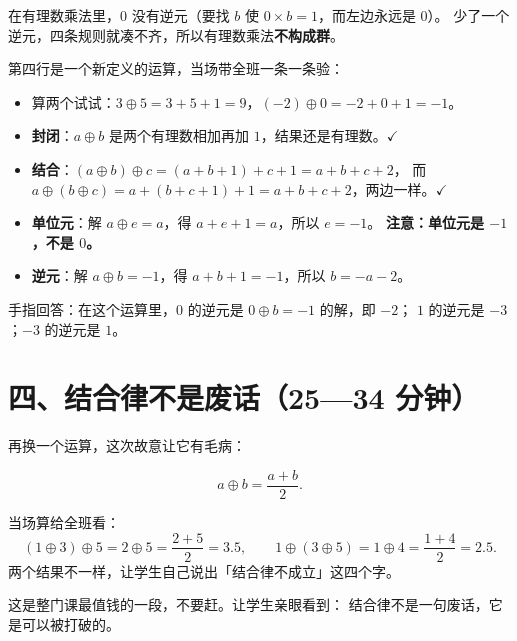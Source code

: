 \begin{dingli}[有理数乘法不构成群]
  在有理数乘法里，\(0\) 没有逆元（要找 \(b\) 使 \(0\times b=1\)，而左边永远是 \(0\)）。
  少了一个逆元，四条规则就凑不齐，所以有理数乘法\textbf{不构成群}。
\end{dingli}

第四行是一个新定义的运算，当场带全班一条一条验：

\begin{example}[新定义运算 \(a\oplus b=a+b+1\)]
  \begin{itemize}
    \item 算两个试试：\(3\oplus5=3+5+1=9\)，\((-2)\oplus0=-2+0+1=-1\)。
    \item \textbf{封闭}：\(a\oplus b\) 是两个有理数相加再加 \(1\)，结果还是有理数。\(\checkmark\)
    \item \textbf{结合}：\((a\oplus b)\oplus c=(a+b+1)+c+1=a+b+c+2\)，
      而 \(a\oplus(b\oplus c)=a+(b+c+1)+1=a+b+c+2\)，两边一样。\(\checkmark\)
    \item \textbf{单位元}：解 \(a\oplus e=a\)，得 \(a+e+1=a\)，所以 \(e=-1\)。
      \textbf{注意：单位元是 \(-1\)，不是 \(0\)。}
    \item \textbf{逆元}：解 \(a\oplus b=-1\)，得 \(a+b+1=-1\)，所以 \(b=-a-2\)。
  \end{itemize}
\end{example}

\begin{caozuo}
  手指回答：在这个运算里，\(0\) 的逆元是 \(0\oplus b=-1\) 的解，即 \(-2\)；
  \(1\) 的逆元是 \(-3\)；\(-3\) 的逆元是 \(1\)。
\end{caozuo}

\section*{四、结合律不是废话（25—34 分钟）}

再换一个运算，这次故意让它有毛病：

\[
  a\oplus b = \frac{a+b}{2} .
\]

\begin{caozuo}
  当场算给全班看：
  \[
    (1\oplus3)\oplus5 = 2\oplus5 = \frac{2+5}{2}=3.5,
    \qquad
    1\oplus(3\oplus5) = 1\oplus4 = \frac{1+4}{2}=2.5 .
  \]
  两个结果不一样，让学生自己说出「结合律不成立」这四个字。
\end{caozuo}

\begin{zhu}
  这是整门课最值钱的一段，不要赶。让学生亲眼看到：
  结合律不是一句废话，它是可以被打破的。
\end{zhu}

